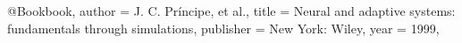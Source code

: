 @Book{book,
author = {J. C. Príncipe, et al.},
title = { Neural and adaptive systems: fundamentals through
simulations},
publisher = {New York: Wiley},
year = {1999},
}
